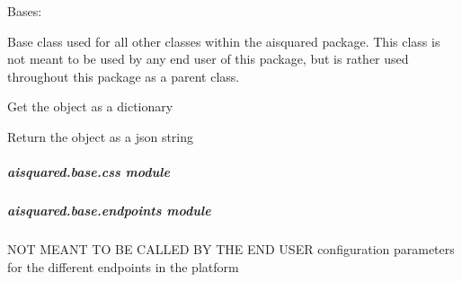 \documentclass[letterpaper,10pt,english]{sphinxmanual}
\begin{document}
\begin{fulllineitems}
\label{\detokenize{aisquared.base:aisquared.base.BaseObject.BaseObject}}
\pysigstartsignatures
{}
\pysigstopsignatures
\sphinxAtStartPar
Bases: 

\sphinxAtStartPar
Base class used for all other classes within the aisquared package. This class is not meant
to be used by any end user of this package, but is rather used throughout this package as a
parent class.

\begin{fulllineitems}
\label{\detokenize{aisquared.base:aisquared.base.BaseObject.BaseObject.to_dict}}
\pysigstartsignatures
{}
\pysigstopsignatures
\sphinxAtStartPar
Get the object as a dictionary

\end{fulllineitems}


\begin{fulllineitems}
\label{\detokenize{aisquared.base:aisquared.base.BaseObject.BaseObject.to_json}}
\pysigstartsignatures
{}
\pysigstopsignatures
\sphinxAtStartPar
Return the object as a json string

\end{fulllineitems}


\end{fulllineitems}



\subparagraph{aisquared.base.css module}
\label{\detokenize{aisquared.base:module-aisquared.base.css}}\label{\detokenize{aisquared.base:aisquared-base-css-module}}

\subparagraph{aisquared.base.endpoints module}
\label{\detokenize{aisquared.base:module-aisquared.base.endpoints}}\label{\detokenize{aisquared.base:aisquared-base-endpoints-module}}
\sphinxAtStartPar
NOT MEANT TO BE CALLED BY THE END USER \sphinxhyphen{} configuration parameters for the different endpoints in the platform
\end{document}
